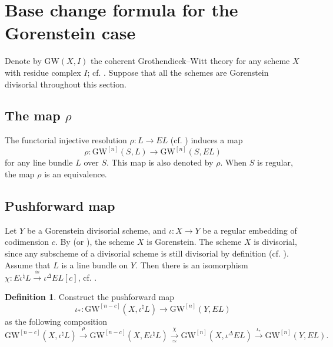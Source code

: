 \documentclass[a4paper]{amsart}
\theoremstyle{plain}
\theoremstyle{definition}
\newtheorem{definition}[theorem]{Definition}
\numberwithin{equation}{section}
\newcommand{\GW}{\mathrm{GW}}
\begin{document}
\section{Base change formula for the Gorenstein case}\label{sec:base_change_gorenstein}

Denote by $\GW(X, I)$ the coherent Grothendieck–Witt theory for any scheme $X$ with residue complex $I$; cf. \cite[Definition 2.6]{huang2023the}. Suppose that all the schemes are Gorenstein divisorial throughout this section.

\subsection{The map \texorpdfstring{$\rho$}{rho}}\label{sect:rho}
The functorial injective resolution $\rho: L \to EL$ (cf. \cite[Remark 4.10]{huang2023the})  induces a map
\[
    \rho:\GW^{[n]}(S,L) \to \GW^{[n]}(S,EL)
\]
for any line bundle $L$ over $S$. This map is also denoted by $\rho$. When $S$ is regular, the map $\rho$ is an equivalence.


\subsection{Pushforward map}
Let $Y$ be a Gorenstein divisorial scheme, and $\iota: X \to Y$ be a regular embedding of codimension $c$. By \cite[Proposition III.7.2, p.179]{hartshorne1966residues}(or \cite[\href{https://stacks.math.columbia.edu/tag/0BVA}{Lemma 0BVA}]{stacks-project}), the scheme $X$ is Gorenstein. The scheme $X$ is divisorial, since any subscheme of a divisorial scheme is still divisorial by definition (cf. \cite[Definition II.2.2.5]{SGA6}).
Assume that $L$ is a line bundle on $Y$. Then there is an isomorphism $\chi: E\iota^{\natural}L \xrightarrow{\cong} \iota^{\Delta}EL[c]$, cf. \cite[Theorem VI.3.1(c), p.318 and Corollary III.7.3, p.180]{hartshorne1966residues}.
\begin{definition}
    Construct the pushforward map
    \[\iota_*:\GW^{[n-c]} (X, \iota^{\natural}L) \to \GW^{[n]}(Y,EL)\]
    as the following composition
    \[\GW^{[n-c]} (X, \iota^{\natural}L) \xrightarrow{\rho} \GW^{[n-c]} (X, E\iota^{\natural}L) \xrightarrow[\simeq]{\chi} \GW^{[n]} (X, \iota^{\Delta}EL) \xrightarrow{\iota_*} \GW^{[n]}(Y,EL).   \]
\end{definition}
\end{document}
